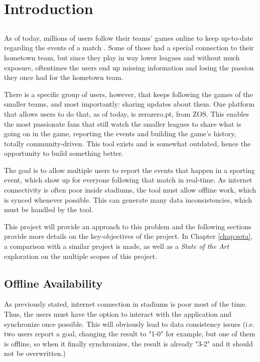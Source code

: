 \chapter{Introduction} \label{chap:intro}

\section*{}

As of today, millions of users follow their teams' games online to keep up-to-date regarding the events of a match \cite{facebook-livestream-stats}. Some of those had a special connection to their hometown team, but since they play in way lower leagues and without much exposure, oftentimes the users end up missing information and losing the passion they once had for the hometown team.

There is a specific group of users, however, that keeps following the games of the smaller teams, and most importantly: sharing updates about them. One platform that allows users to do that, as of today, is zerozero.pt, from ZOS. This enables the most passionate fans that still watch the smaller leagues to share what is going on in the game, reporting the events and building the game's history, totally community-driven. This tool exists and is somewhat outdated, hence the opportunity to build something better.

The goal is to allow multiple users to report the events that happen in a sporting event, which show up for everyone following that match in real-time. As internet connectivity is often poor inside stadiums, the tool must allow offline work, which is synced whenever possible. This can generate many data inconsistencies, which must be handled by the tool.

This project will provide an approach to this problem and the following sections provide more details on the key-objectives of the project. In Chapter \ref{chap:sota}, a comparison with a similar project is made, as well as a \textit{State of the Art} exploration on the multiple scopes of this project.

\section{Offline Availability} \label{sec:offline-avail-intro}

As previously stated, internet connection in stadiums is poor most of the time. Thus, the users must have the option to interact with the application and synchronize once possible. This will obviously lead to data consistency issues (i.e. two users report a goal, changing the result to "1-0" for example, but one of them is offline, so when it finally synchronizes, the result is already "3-2" and it should not be overwritten.)

